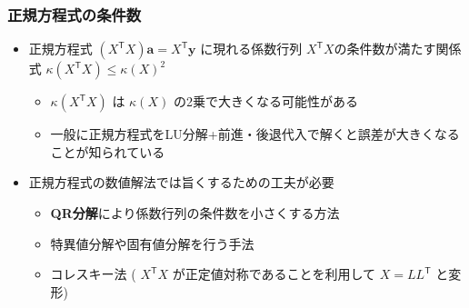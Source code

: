 \documentclass[dvipdfmx,aspectratio=169,20pt]{beamer}
\newcommand{\myfontsetting}[3]{{\fontsize{#1}{#2}\selectfont #3}}
\begin{document}
\begin{frame}
\frametitle{{\large 正規方程式の条件数}}
\begin{itemize}
    \setlength{\itemsep}{0.25cm}
    \item \myfontsetting{15pt}{15pt}{
        正規方程式 $(X^\mathsf{T} X) \bm{a} = X^\mathsf{T} \bm{y}$ に現れる係数行列 $X^\mathsf{T} X$の条件数が満たす関係式 $\kappa(X^\mathsf{T} X) \le \kappa(X)^2$
    }
    \begin{itemize}
        \item \myfontsetting{12pt}{12pt}{
        $\kappa(X^\mathsf{T} X)$ は $\kappa(X)$ の2乗で大きくなる可能性がある
        }
        \item \myfontsetting{12pt}{12pt}{
        一般に正規方程式をLU分解+前進・後退代入で解くと誤差が大きくなることが知られている
        }
    \end{itemize}
    \item \myfontsetting{15pt}{15pt}{
    正規方程式の数値解法では旨くするための工夫が必要
    }
    \begin{itemize}
        \item \myfontsetting{12pt}{12pt}{
        {\bf QR分解}により係数行列の条件数を小さくする方法
        }
        \item \myfontsetting{12pt}{12pt}{ 特異値分解や固有値分解を行う手法
        }
        \item \myfontsetting{12pt}{12pt}{
       コレスキー法 \myfontsetting{8pt}{8pt}{ ( $X^\mathsf{T}X$ が正定値対称であることを利用して $X=LL^\mathsf{T}$ と変形) }
        }
    \end{itemize}
\end{itemize}
\end{frame}
\end{document}
